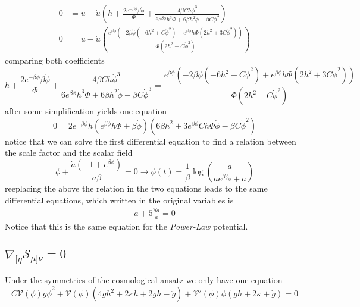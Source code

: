 \documentclass[10pt,a4paper]{article}
\begin{document}
\begin{align}
  0 & = \ddot{u} -\dot{u}\left( h + \frac{2e^{-\beta\phi}\beta\dot{\phi}}{\Phi} + \frac{4\beta C h\dot{\phi}^3}{6e^{\beta\phi}h^3\Phi + 6\beta h^2 \dot{\phi} - \beta C\dot{\phi}^3}\right) \\
  0 & = \ddot{u} -\dot{u}\left(\frac{e^{\beta\phi}\left(-2\beta\dot{\phi}\left(-6h^2 + C\dot{\phi}^2\right) + e^{\beta\phi}h\Phi \left(2h^2 + 3C\dot{\phi}^2\right)\right)}{\Phi \left(2h^2 - C\dot{\phi}^2\right)}\right)
\end{align}
comparing both coefficients 
\begin{equation}
  h + \frac{2e^{-\beta\phi}\beta\dot{\phi}}{\Phi} + \frac{4\beta C h\dot{\phi}^3}{6e^{\beta\phi}h^3\Phi + 6\beta h^2 \dot{\phi} - 
  \beta C\dot{\phi}^3} = \frac{e^{\beta\phi}\left(-2\beta\dot{\phi}\left(-6h^2 + C\dot{\phi}^2\right) + e^{\beta\phi}h\Phi 
  \left(2h^2 + 3C\dot{\phi}^2\right)\right)}{\Phi \left(2h^2 - C\dot{\phi}^2\right)}
\end{equation}
after some simplification yields one equation
\begin{equation}
  0 = 2e^{-\beta \phi}h \left(e^{\beta\phi}h\Phi + \beta\dot{\phi}\right)\left(6\beta h^2 + 3e^{\beta\phi}C h\Phi \dot{\phi} - \beta C\dot{\phi}^2\right)
\end{equation}
notice that we can solve the first differential equation to find a relation between the scale factor and the scalar field
\begin{equation}
  \dot{\phi} + \frac{\dot{a}\left(-1 + e^{\beta\phi}\right)}{a\beta} = 0 \to \phi (t) = \frac{1}{\beta}\log\left(\frac{a}{ae^{\beta \phi_0} + a}\right)
\end{equation}
reeplacing the above the relation in the two equations leads to the same differential equations, which written in the original variables is
\begin{align}
  \dddot{a} + 5\frac{\ddot{a}\dot{a}}{a} = 0
\end{align}
Notice that this is the same equation for the \textit{Power-Law} potential.


\subsection{$\nabla_{[\eta} \mathcal{S}_{\mu]\nu} = 0 $}

Under the symmetries of the cosmological ansatz we only have one equation 
\begin{equation}
  C\mathcal{V}(\phi)g\dot{\phi}^2 + \mathcal{V}(\phi)\left(4gh^2 +2\kappa h + 2g\dot{h} - \ddot{g}\right) +
  \mathcal{V}'(\phi)\dot{\phi}\left(gh + 2\kappa + \dot{g}\right) = 0
\end{equation}
\end{document}
